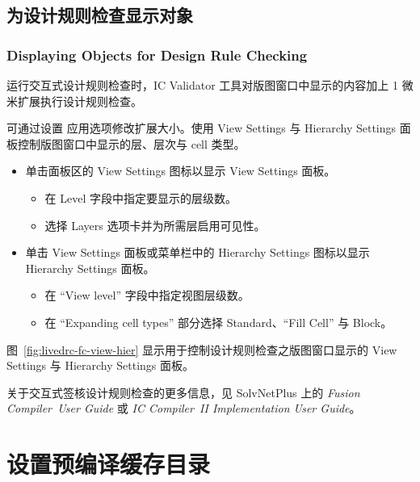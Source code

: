 \subsection{为设计规则检查显示对象}
\subsubsection*{Displaying Objects for Design Rule Checking}

运行交互式设计规则检查时，IC Validator 工具对版图窗口中显示的内容加上 1 微米扩展执行设计规则检查。

可通过设置  应用选项修改扩展大小。使用 View Settings 与 Hierarchy Settings 面板控制版图窗口中显示的层、层次与 cell 类型。
\begin{itemize}
  \item 单击面板区的 View Settings 图标以显示 View Settings 面板。
  \begin{itemize}
    \item 在 Level 字段中指定要显示的层级数。
    \item 选择 Layers 选项卡并为所需层启用可见性。
  \end{itemize}
  \item 单击 View Settings 面板或菜单栏中的 Hierarchy Settings 图标以显示 Hierarchy Settings 面板。
  \begin{itemize}
    \item 在 ``View level'' 字段中指定视图层级数。
    \item 在 ``Expanding cell types'' 部分选择 Standard、``Fill Cell'' 与 Block。
  \end{itemize}
\end{itemize}

图~\ref{fig:livedrc-fc-view-hier} 显示用于控制设计规则检查之版图窗口显示的 View Settings 与 Hierarchy Settings 面板。


\begin{noteBox}
关于交互式签核设计规则检查的更多信息，见 SolvNetPlus 上的 \textit{Fusion Compiler\texttrademark\ User Guide} 或 \textit{IC Compiler\texttrademark\ II Implementation User Guide}。
\end{noteBox}

\section{设置预编译缓存目录}
